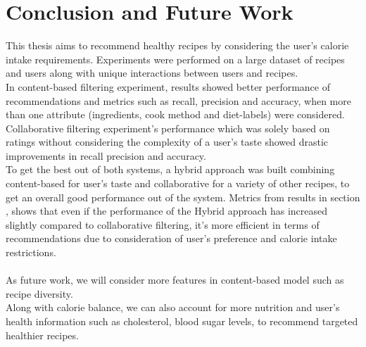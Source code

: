 \chapter{Conclusion and Future Work}
\label{ch:conclusion}
This thesis aims to recommend healthy recipes by considering the user's calorie intake requirements. Experiments were performed on a large dataset of recipes and users along with unique interactions between users and recipes. \\
In content-based filtering experiment, results showed better performance of recommendations and metrics such as recall, precision and accuracy, when more than one attribute (ingredients, cook method and diet-labels) were considered. \\
Collaborative filtering experiment's performance which was solely based on ratings without considering the complexity of a user's taste showed drastic improvements in recall precision and accuracy.\\
To get the best out of both systems, a hybrid approach was built combining content-based for user's taste and collaborative for a variety of other recipes, to get an overall good performance out of the system.
Metrics from results in section , shows that even if the performance of the Hybrid approach has increased slightly compared to collaborative filtering, it's more efficient in terms of recommendations due to consideration of user's preference and calorie intake restrictions. \\
\\
As future work, we will consider more features in content-based model such as recipe diversity.
\\Along with calorie balance, we can also account for more nutrition and user's health information such as cholesterol, blood sugar levels, to recommend targeted healthier recipes.